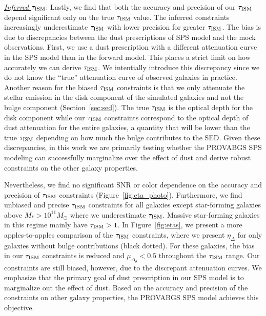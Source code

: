 \noindent \underline{\emph{Inferred $\tau_{\rm ISM}$}}:  
Lastly, we find that both the accuracy and precision of our $\tau_{\rm ISM}$ depend
significant only on the true $\tau_{\rm ISM}$ value. 
The inferred constraints increasingly underestimate $\tau_{\rm ISM}$ with lower
precision for greater $\tau_{\rm ISM}$.
The bias is due to discrepancies between the dust prescriptions of SPS model
and the mock observations. 
First, we use a dust prescription with a different attenuation curve in the SPS
model than in the forward model. 
This places a strict limit on how accurately we can derive $\tau_{\rm ISM}$.
We intentially introduce this discrepancy since we do not know the ``true''
attenuation curve of observed galaxies in practice. 
Another reason for the biased $\tau_{\rm ISM}$ constraints is that we only attenuate
the stellar emission in the disk component of the simulated galaxies and not
the bulge component (Section~\ref{sec:sed}).
The true $\tau_{\rm ISM}$ is the optical depth for the disk component while our
$\tau_{\rm ISM}$ constraints correspond to the optical depth of dust attenuation
for the entire galaxies, a quantity that will be lower than the true $\tau_{\rm ISM}$
depending on how much the bulge contributes to the SED. 
Given these discrepancies, in this work we are primarily testing whether the
{\sc PROVABGS} SPS modeling can successfully marginalize over the effect of
dust and derive robust constraints on the other galaxy properties.

Nevertheless, we find no significant SNR or color dependence on the accuracy
and precision of $\tau_{\rm ISM}$ constraints (Figure~\ref{fig:eta_photo}). 
Furthermore, we find unbiased and precise $\tau_{\rm ISM}$ constraints for all galaxies
except star-forming galaxies above $M_* > 10^{11}M_\odot$ where we underestimate 
$\tau_{\rm ISM}$. 
Massive star-forming galaxies in this regime mainly have $\tau_{\rm ISM} > 1$.
In Figure~\ref{fig:etas}, we present a more apples-to-apples comparison of the
$\tau_{\rm ISM}$ constraints, where we present $\eta_\Delta$ for only galaxies without
bulge contributions (black dotted). 
For these galaxies, the bias in our $\tau_{\rm ISM}$ constraints is reduced and
$\mu_{\Delta_\theta}<0.5$ throughout the $\tau_{\rm ISM}$ range. 
Our constraints are still biased, however, due to the discrepant attenuation
curves. 
We emphasize that the primary goal of dust prescription in our SPS model is to
marginalize out the effect of dust. 
Based on the accuracy and precision of the constraints on other galaxy
properties, the {\sc PROVABGS} SPS model achieves this objective.  
